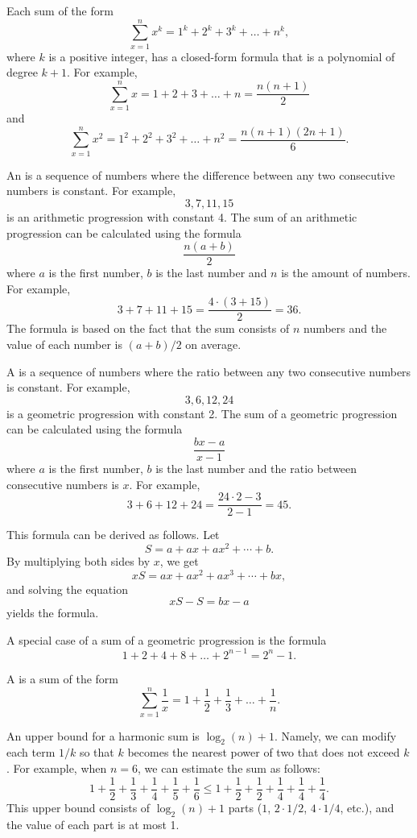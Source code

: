 Each sum of the form
\[\sum_{x=1}^n x^k = 1^k+2^k+3^k+\ldots+n^k,\]
where $k$ is a positive integer,
has a closed-form formula that is a
polynomial of degree $k+1$.
For example,
\[\sum_{x=1}^n x = 1+2+3+\ldots+n = \frac{n(n+1)}{2}\]
and
\[\sum_{x=1}^n x^2 = 1^2+2^2+3^2+\ldots+n^2 = \frac{n(n+1)(2n+1)}{6}.\]

An  is a 
sequence of numbers
where the difference between any two consecutive
numbers is constant.
For example,
\[3, 7, 11, 15\]
is an arithmetic progression with constant 4.
The sum of an arithmetic progression can be calculated
using the formula
\[\frac{n(a+b)}{2}\]
where $a$ is the first number,
$b$ is the last number and
$n$ is the amount of numbers.
For example,
\[3+7+11+15=\frac{4 \cdot (3+15)}{2} = 36.\]
The formula is based on the fact
that the sum consists of $n$ numbers and
the value of each number is $(a+b)/2$ on average.

A  is a sequence
of numbers
where the ratio between any two consecutive
numbers is constant.
For example,
\[3,6,12,24\]
is a geometric progression with constant 2.
The sum of a geometric progression can be calculated
using the formula
\[\frac{bx-a}{x-1}\]
where $a$ is the first number,
$b$ is the last number and the
ratio between consecutive numbers is $x$.
For example,
\[3+6+12+24=\frac{24 \cdot 2 - 3}{2-1} = 45.\]

This formula can be derived as follows. Let
\[ S = a + ax + ax^2 + \cdots + b .\]
By multiplying both sides by $x$, we get
\[ xS = ax + ax^2 + ax^3 + \cdots + bx,\]
and solving the equation
\[ xS-S = bx-a\]
yields the formula.

A special case of a sum of a geometric progression is the formula
\[1+2+4+8+\ldots+2^{n-1}=2^n-1.\]


A  is a sum of the form
\[ \sum_{x=1}^n \frac{1}{x} = 1+\frac{1}{2}+\frac{1}{3}+\ldots+\frac{1}{n}.\]

An upper bound for a harmonic sum is $\log_2(n)+1$.
Namely, we can
modify each term $1/k$ so that $k$ becomes
the nearest power of two that does not exceed $k$.
For example, when $n=6$, we can estimate
the sum as follows:
\[ 1+\frac{1}{2}+\frac{1}{3}+\frac{1}{4}+\frac{1}{5}+\frac{1}{6} \le
1+\frac{1}{2}+\frac{1}{2}+\frac{1}{4}+\frac{1}{4}+\frac{1}{4}.\]
This upper bound consists of $\log_2(n)+1$ parts
($1$, $2 \cdot 1/2$, $4 \cdot 1/4$, etc.),
and the value of each part is at most 1.

